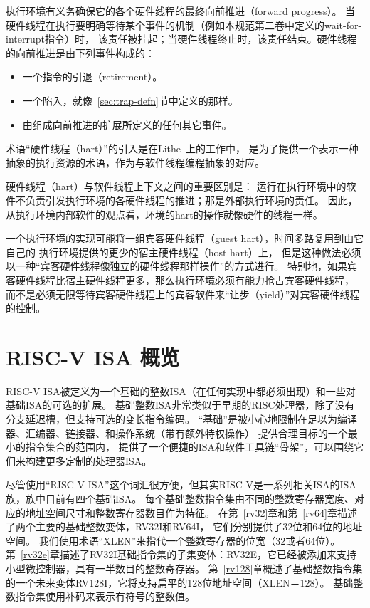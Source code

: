 执行环境有义务确保它的各个硬件线程的最终向前推进（forward progress）。
当硬件线程在执行要明确等待某个事件的机制（例如本规范第二卷中定义的wait-for-interrupt指令）时，
该责任被挂起；当硬件线程终止时，该责任结束。硬件线程的向前推进是由下列事件构成的：

\vspace{-0.2in}
\begin{itemize}
\parskip 0pt
\itemsep 1pt
\item 一个指令的引退（retirement）。
\item 一个陷入，就像~\ref{sec:trap-defn}节中定义的那样。
\item 由组成向前推进的扩展所定义的任何其它事件。
\end{itemize}

\begin{commentary}

术语“硬件线程（hart）”的引入是在Lithe~\cite{lithe-pan-hotpar09,lithe-pan-pldi10}上的工作中，
是为了提供一个表示一种抽象的执行资源的术语，作为与软件线程编程抽象的对应。

硬件线程（hart）与软件线程上下文之间的重要区别是：
运行在执行环境中的软件不负责引发执行环境的各硬件线程的推进；那是外部执行环境的责任。
因此，从执行环境内部软件的观点看，环境的hart的操作就像硬件的线程一样。

一个执行环境的实现可能将一组宾客硬件线程（guest hart），时间多路复用到由它自己的
执行环境提供的更少的宿主硬件线程（host hart）上，
但是这种做法必须以一种“宾客硬件线程像独立的硬件线程那样操作”的方式进行。
特别地，如果宾客硬件线程比宿主硬件线程更多，那么执行环境必须有能力抢占宾客硬件线程，
而不是必须无限等待宾客硬件线程上的宾客软件来“让步（yield）”对宾客硬件线程的控制。

\end{commentary}

\section{RISC-V ISA 概览}

RISC-V ISA被定义为一个基础的整数ISA（在任何实现中都必须出现）和一些对基础ISA的可选的扩展。
基础整数ISA非常类似于早期的RISC处理器，除了没有分支延迟槽，但支持可选的变长指令编码。
“基础”是被小心地限制在足以为编译器、汇编器、链接器、和操作系统（带有额外特权操作）
提供合理目标的一个最小的指令集合的范围内，
提供了一个便捷的ISA和软件工具链“骨架”，可以围绕它们来构建更多定制的处理器ISA。

尽管使用“RISC-V ISA”这个词汇很方便，但其实RISC-V是一系列相关ISA的ISA族，族中目前有四个基础ISA。
每个基础整数指令集由不同的整数寄存器宽度、对应的地址空间尺寸和整数寄存器数目作为特征。
在第~\ref{rv32}章和第~\ref{rv64}章描述了两个主要的基础整数变体，RV32I和RV64I，
它们分别提供了32位和64位的地址空间。
我们使用术语“XLEN”来指代一个整数寄存器的位宽（32或者64位）。
第~\ref{rv32e}章描述了RV32I基础指令集的子集变体：RV32E，它已经被添加来支持小型微控制器，具有一半数目的整数寄存器。
第~\ref{rv128}章概述了基础整数指令集的一个未来变体RV128I，它将支持扁平的128位地址空间（XLEN＝128）。
基础整数指令集使用补码来表示有符号的整数值。


